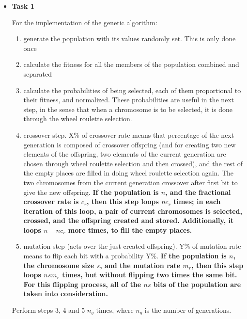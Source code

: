 \documentclass[paper=a4, fontsize=11pt]{scrartcl} %
\numberwithin{equation}{section} %
\numberwithin{figure}{section} %
\numberwithin{table}{section} %
\begin{document}
\begin{itemize}

\item \textbf{Task 1}

For the implementation of the genetic algorithm:

\begin{enumerate}

\item generate the population with its values randomly set. This is only done once

\item calculate the fitness for all the members of the population combined and separated

\item calculate the probabilities of being selected, each of them proportional to their fitness, and normalized. These probabilities are useful in the next step, in the sense that when a chromosome is to be selected, it is done through the wheel roulette selection.

\item crossover step. X\% of crossover rate means that percentage of the next generation is composed of crossover offspring (and for creating two new elements of the offspring, two elements of the current generation are chosen through wheel roulette selection and then crossed), and the rest of the empty places are filled in doing wheel roulette selection again. The two chromosomes from the current generation crossover after first bit to give the new offspring. \textbf{If the population is $n$, and the fractional crossover rate is $c_{r}$, then this step loops $nc_{r}$ times; in each iteration of this loop, a pair of current chromosomes is selected, crossed, and the offspring created and stored. Additionally, it loops $n-nc_{r}$ more times, to fill the empty places.}

\item mutation step (acts over the just created offspring). Y\% of mutation rate means to flip each bit with a probability Y\%. \textbf{If the population is $n$, the chromosome size $s$, and the mutation rate $m_{r}$, then this step loops $nsm_{r}$ times, but without flipping two times the same bit. For this flipping process, all of the $ns$ bits of the population are taken into consideration.}


\end{enumerate}

Perform steps 3, 4 and 5 $n_{g}$ times, where $n_{g}$ is the number of generations.


\end{itemize}
\end{document}
